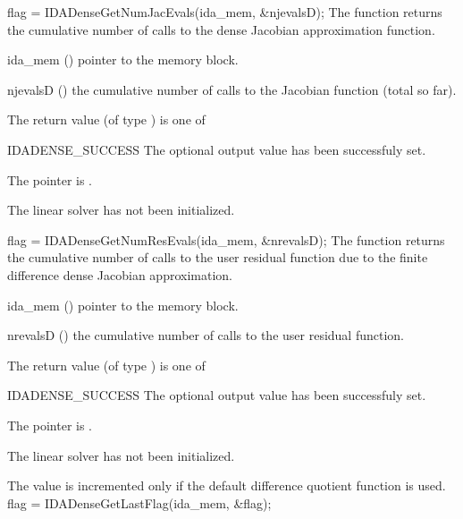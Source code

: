 {
  flag = IDADenseGetNumJacEvals(ida\_mem, \&njevalsD);
}
{
  The function  returns the
  cumulative number of calls to the dense Jacobian approximation function.
}
{
  \begin{args}[njevalsD]
  \item[ida\_mem] ()
    pointer to the {\ida} memory block.
  \item[njevalsD] ()
    the cumulative number of calls to the Jacobian function (total so far).
  \end{args}
}
{
  The return value  (of type ) is one of
  \begin{args}
  \item[IDADENSE\_SUCCESS] 
    The optional output value has been successfuly set.
  \item[\Id{IDADENSE\_MEM\_NULL}]
    The  pointer is .
  \item[\Id{IDADENSE\_LMEM\_NULL}]
    The {\idadense} linear solver has not been initialized.
  \end{args}
}
{}
{
  flag = IDADenseGetNumResEvals(ida\_mem, \&nrevalsD);
}
{
  The function  returns the
  cumulative number of calls to the user residual function due to the 
  finite difference dense Jacobian approximation.
}
{
  \begin{args}[nrevalsD]
  \item[ida\_mem] ()
    pointer to the {\ida} memory block.
  \item[nrevalsD] ()
    the cumulative number of calls to the user residual function.
  \end{args}
}
{
  The return value  (of type ) is one of
  \begin{args}
  \item[IDADENSE\_SUCCESS] 
    The optional output value has been successfuly set.
  \item[\Id{IDADENSE\_MEM\_NULL}]
    The  pointer is .
  \item[\Id{IDADENSE\_LMEM\_NULL}]
    The {\idadense} linear solver has not been initialized.
  \end{args}
}
{
  The value  is incremented only if the default 
   difference quotient function is used.
}
{
  flag = IDADenseGetLastFlag(ida\_mem, \&flag);
}
